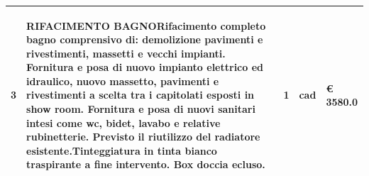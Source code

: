 \documentclass[a4paper]{article}
\begin{document}
\begin{tabular}{ | L{10mm} |  L{86mm} | L{12mm} | L{12mm} | L{16mm} | }
                                 
                                   \vspace{2.5mm}
                                   \begin{spacing}{0}
                                3
                                   \end{spacing} &
                                   \vspace{2.5mm}
                                   \begin{spacing}{0}
                                RIFACIMENTO BAGNORifacimento completo bagno comprensivo di: demolizione pavimenti e rivestimenti, massetti e vecchi impianti. Fornitura e posa di nuovo impianto elettrico ed idraulico, nuovo massetto, pavimenti e rivestimenti a scelta tra i capitolati esposti in show room. Fornitura e posa di nuovi sanitari intesi come wc, bidet, lavabo e relative rubinetterie. Previsto il riutilizzo del radiatore esistente.Tinteggiatura in tinta bianco traspirante a fine intervento. Box doccia ecluso.
                                   \end{spacing} &
                                   \vspace{2.5mm}
                                   \begin{spacing}{0}
                                1
                                   \end{spacing} &
                                   \vspace{2.5mm}
                                   \begin{spacing}{0}
                                cad
                                   \end{spacing} &
                                   \vspace{2.5mm}
                                   \begin{spacing}{0}
                                     \euro\hfill 
                                 3580.0
                                   \end{spacing} \\
                                   \hline

                                 \end{tabular} \\
\end{document}
